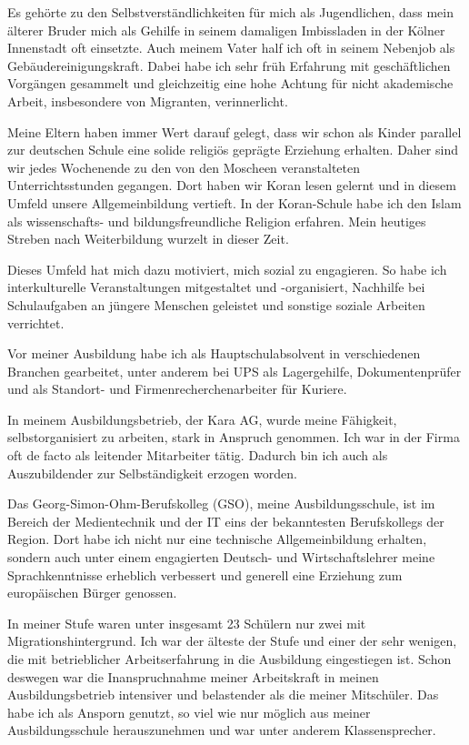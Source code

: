 \documentclass[a4paper]{article}
\begin{document}
Es gehörte zu den Selbstverständlichkeiten für mich als Jugendlichen, dass mein älterer Bruder mich als Gehilfe in seinem damaligen Imbissladen in der Kölner Innenstadt oft einsetzte. Auch meinem Vater half ich oft in seinem Nebenjob als Gebäudereinigungskraft. Dabei  habe ich sehr früh Erfahrung mit geschäftlichen Vorgängen gesammelt und gleichzeitig eine hohe Achtung für nicht akademische Arbeit, insbesondere von Migranten, verinnerlicht.

Meine Eltern haben immer Wert darauf gelegt, dass wir schon als Kinder parallel zur deutschen Schule eine solide religiös geprägte Erziehung erhalten. Daher sind wir jedes Wochenende zu den von den Moscheen veranstalteten Unterrichtsstunden gegangen. Dort haben wir Koran lesen gelernt und in diesem Umfeld unsere Allgemeinbildung vertieft. In der Koran-Schule habe ich den Islam als wissenschafts- und bildungsfreundliche Religion erfahren. Mein heutiges Streben nach Weiterbildung wurzelt in dieser Zeit.

Dieses Umfeld hat mich dazu motiviert, mich sozial zu engagieren. So habe ich interkulturelle Veranstaltungen mitgestaltet und -organisiert, Nachhilfe bei Schulaufgaben an jüngere Menschen geleistet und sonstige soziale Arbeiten verrichtet.

Vor meiner Ausbildung habe ich als Hauptschulabsolvent in verschiedenen Branchen gearbeitet, unter anderem bei UPS als Lagergehilfe, Dokumentenprüfer und als  Standort- und Firmenrecherchenarbeiter für Kuriere.

In meinem Ausbildungsbetrieb, der Kara AG, wurde meine Fähigkeit, selbstorganisiert zu arbeiten, stark in Anspruch genommen. Ich war in der Firma oft de facto als leitender Mitarbeiter tätig. Dadurch bin ich auch als Auszubildender zur Selbständigkeit erzogen worden.

Das Georg-Simon-Ohm-Berufskolleg (GSO), meine Ausbildungsschule, ist im Bereich der Medientechnik und der IT eins der bekanntesten Berufskollegs der Region. Dort habe ich nicht nur eine technische Allgemeinbildung erhalten, sondern auch unter einem engagierten Deutsch- und Wirtschaftslehrer meine Sprachkenntnisse erheblich verbessert und generell eine Erziehung zum europäischen Bürger genossen.

In meiner Stufe waren unter insgesamt 23 Schülern nur zwei mit Migrationshintergrund. Ich war der älteste der Stufe und einer der sehr wenigen, die mit betrieblicher Arbeitserfahrung in die Ausbildung eingestiegen ist. Schon deswegen war die Inanspruchnahme meiner Arbeitskraft in meinen Ausbildungsbetrieb intensiver und belastender als die meiner Mitschüler. Das habe ich als Ansporn genutzt, so viel wie nur möglich aus meiner Ausbildungsschule herauszunehmen und war unter anderem Klassensprecher.
\end{document}

